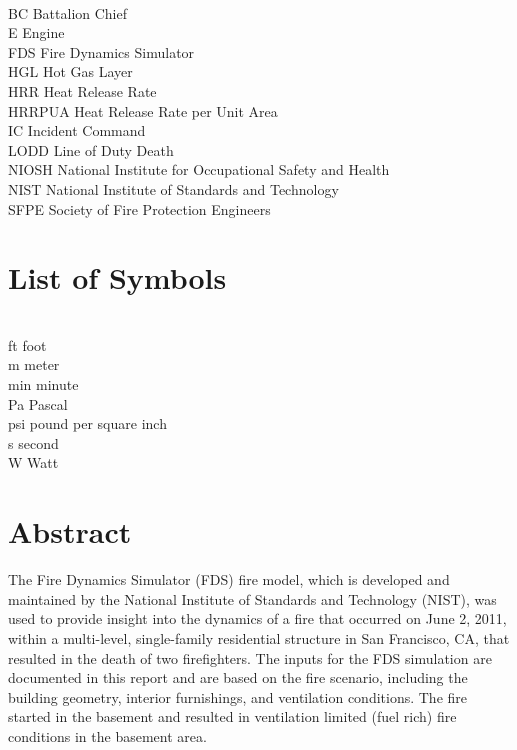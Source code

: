 \documentclass[12pt,oneside]{book}
\begin{document}
\begin{tabbing}
\hspace{1.5in} \= \\
BC \> Battalion Chief \\
E \> Engine \\
FDS \> Fire Dynamics Simulator \\
HGL \> Hot Gas Layer \\
HRR \> Heat Release Rate \\
HRRPUA \> Heat Release Rate per Unit Area \\
IC \> Incident Command \\
LODD \> Line of Duty Death \\
NIOSH \> National Institute for Occupational Safety and Health \\
NIST \> National Institute of Standards and Technology \\
SFPE \> Society of Fire Protection Engineers \\
\end{tabbing}

\chapter{List of Symbols}

\begin{tabbing}
\hspace{1.5in} \= \\
ft \> foot \\
m \> meter \\
min \> minute \\
Pa \> Pascal \\
psi \> pound per square inch \\
s \> second \\
W \> Watt \\
\end{tabbing}

\mainmatter


\chapter*{\centering Abstract}

The Fire Dynamics Simulator (FDS) fire model, which is developed and maintained by the National Institute of Standards and Technology (NIST), was used to provide insight into the dynamics of a fire that occurred on June 2, 2011, within a multi-level, single-family residential structure in San Francisco, CA, that resulted in the death of two firefighters. The inputs for the FDS simulation are documented in this report and are based on the fire scenario, including the building geometry, interior furnishings, and ventilation conditions. The fire started in the basement and resulted in ventilation limited (fuel rich) fire conditions in the basement area.
\end{document}
